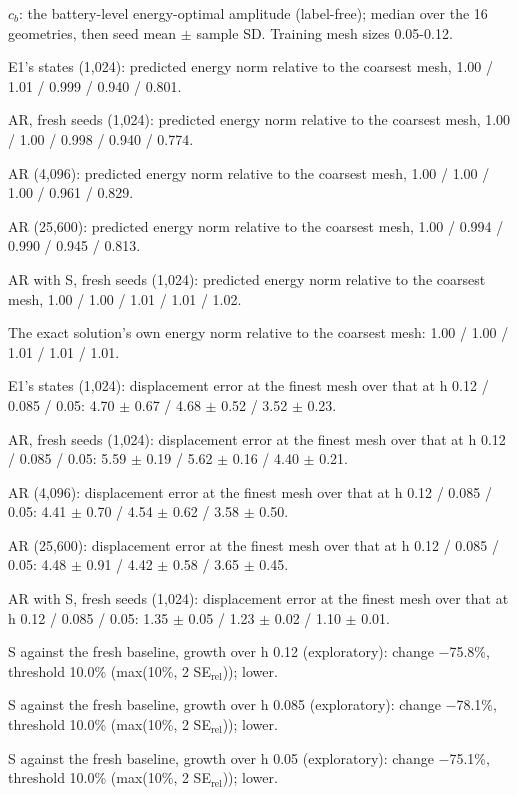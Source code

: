 \begin{table}[t]
\smallskip
\begin{minipage}{\linewidth}\footnotesize\raggedright
$c_b$: the battery-level energy-optimal amplitude (label-free); median over the 16 geometries, then seed mean $\pm$ sample SD. Training mesh sizes 0.05-0.12.\par
E1's states (1,024): predicted energy norm relative to the coarsest mesh, 1.00 / 1.01 / 0.999 / 0.940 / 0.801.\par
AR, fresh seeds (1,024): predicted energy norm relative to the coarsest mesh, 1.00 / 1.00 / 0.998 / 0.940 / 0.774.\par
AR (4,096): predicted energy norm relative to the coarsest mesh, 1.00 / 1.00 / 1.00 / 0.961 / 0.829.\par
AR (25,600): predicted energy norm relative to the coarsest mesh, 1.00 / 0.994 / 0.990 / 0.945 / 0.813.\par
AR with S, fresh seeds (1,024): predicted energy norm relative to the coarsest mesh, 1.00 / 1.00 / 1.01 / 1.01 / 1.02.\par
The exact solution's own energy norm relative to the coarsest mesh: 1.00 / 1.00 / 1.01 / 1.01 / 1.01.\par
E1's states (1,024): displacement error at the finest mesh over that at h 0.12 / 0.085 / 0.05: 4.70 $\pm$ 0.67 / 4.68 $\pm$ 0.52 / 3.52 $\pm$ 0.23.\par
AR, fresh seeds (1,024): displacement error at the finest mesh over that at h 0.12 / 0.085 / 0.05: 5.59 $\pm$ 0.19 / 5.62 $\pm$ 0.16 / 4.40 $\pm$ 0.21.\par
AR (4,096): displacement error at the finest mesh over that at h 0.12 / 0.085 / 0.05: 4.41 $\pm$ 0.70 / 4.54 $\pm$ 0.62 / 3.58 $\pm$ 0.50.\par
AR (25,600): displacement error at the finest mesh over that at h 0.12 / 0.085 / 0.05: 4.48 $\pm$ 0.91 / 4.42 $\pm$ 0.58 / 3.65 $\pm$ 0.45.\par
AR with S, fresh seeds (1,024): displacement error at the finest mesh over that at h 0.12 / 0.085 / 0.05: 1.35 $\pm$ 0.05 / 1.23 $\pm$ 0.02 / 1.10 $\pm$ 0.01.\par
S against the fresh baseline, growth over h 0.12 (exploratory): change $-$75.8\%, threshold 10.0\% (max(10\%, 2 SE$_\mathrm{rel}$)); lower.\par
S against the fresh baseline, growth over h 0.085 (exploratory): change $-$78.1\%, threshold 10.0\% (max(10\%, 2 SE$_\mathrm{rel}$)); lower.\par
S against the fresh baseline, growth over h 0.05 (exploratory): change $-$75.1\%, threshold 10.0\% (max(10\%, 2 SE$_\mathrm{rel}$)); lower.
\end{minipage}
\end{table}
